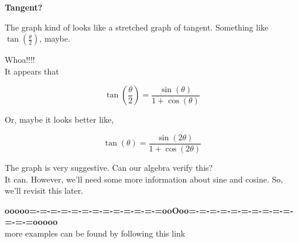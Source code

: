 \documentclass{ximera}
\begin{document}
\begin{observation}   \textbf{Tangent?}


The graph kind of looks like a stretched graph of tangent.  Something like $\tan\left( \frac{\theta}{2} \right)$, maybe.






\begin{center}
\end{center}


Whoa!!!! \\


It appears that


\[   \tan\left( \frac{\theta}{2} \right)   = \frac{\sin(\theta)}{1 + \cos(\theta)}   \]




Or, maybe it looks better like, 




\[   \tan(\theta)   = \frac{\sin(2\theta)}{1 + \cos(2\theta)}   \]





The graph is very suggestive.  Can our algebra verify this? \\


It can.  However, we'll need some more information about sine and cosine.  So, we'll revisit this later.



\end{observation}

















\begin{center}
\textbf{\textcolor{green!50!black}{ooooo=-=-=-=-=-=-=-=-=-=-=-=-=ooOoo=-=-=-=-=-=-=-=-=-=-=-=-=ooooo}} \\

more examples can be found by following this link\\ 

\end{center}
\end{document}
